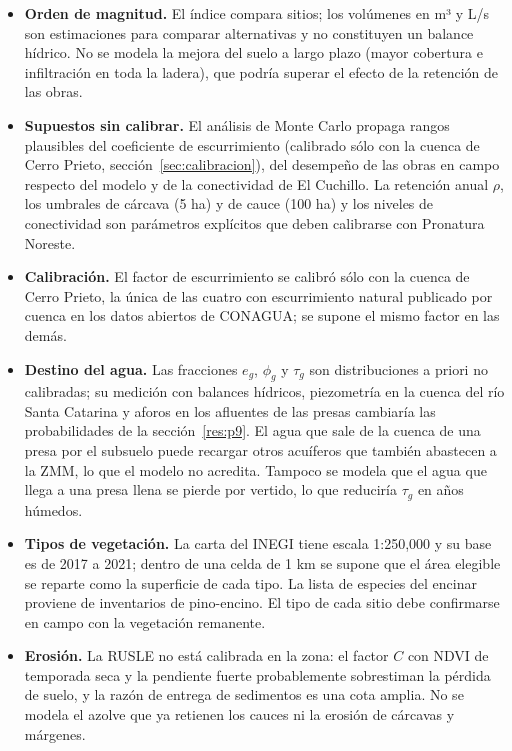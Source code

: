 \documentclass[11pt,letterpaper]{article}
\begin{document}
\begin{itemize}
  \item \textbf{Orden de magnitud.} El índice compara sitios; los volúmenes en m³ y L/s son estimaciones para comparar alternativas y no constituyen un balance hídrico. No se modela la mejora del suelo a largo plazo (mayor cobertura e infiltración en toda la ladera), que podría superar el efecto de la retención de las obras.
  \item \textbf{Supuestos sin calibrar.} El análisis de Monte Carlo propaga rangos plausibles del coeficiente de escurrimiento (calibrado sólo con la cuenca de Cerro Prieto, sección~\ref{sec:calibracion}), del desempeño de las obras en campo respecto del modelo y de la conectividad de El Cuchillo. La retención anual $\rho$, los umbrales de cárcava (5 ha) y de cauce (100 ha) y los niveles de conectividad son parámetros explícitos que deben calibrarse con Pronatura Noreste.
  \item \textbf{Calibración.} El factor de escurrimiento se calibró sólo con la cuenca de Cerro Prieto, la única de las cuatro con escurrimiento natural publicado por cuenca en los datos abiertos de CONAGUA; se supone el mismo factor en las demás.
  \item \textbf{Destino del agua.} Las fracciones $e_g$, $\phi_g$ y $\tau_g$ son distribuciones a priori no calibradas; su medición con balances hídricos, piezometría en la cuenca del río Santa Catarina y aforos en los afluentes de las presas cambiaría las probabilidades de la sección~\ref{res:p9}. El agua que sale de la cuenca de una presa por el subsuelo puede recargar otros acuíferos que también abastecen a la ZMM, lo que el modelo no acredita. Tampoco se modela que el agua que llega a una presa llena se pierde por vertido, lo que reduciría $\tau_g$ en años húmedos.
  \item \textbf{Tipos de vegetación.} La carta del INEGI tiene escala 1:250,000 y su base es de 2017 a 2021; dentro de una celda de 1 km se supone que el área elegible se reparte como la superficie de cada tipo. La lista de especies del encinar proviene de inventarios de pino-encino. El tipo de cada sitio debe confirmarse en campo con la vegetación remanente.
  \item \textbf{Erosión.} La RUSLE no está calibrada en la zona: el factor $C$ con NDVI de temporada seca y la pendiente fuerte probablemente sobrestiman la pérdida de suelo, y la razón de entrega de sedimentos es una cota amplia. No se modela el azolve que ya retienen los cauces ni la erosión de cárcavas y márgenes.

\end{itemize}
\end{document}
